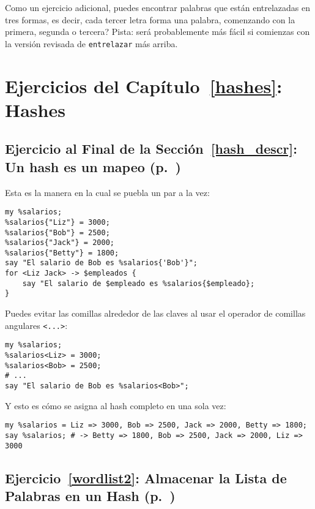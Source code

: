 Como un ejercicio adicional, puedes encontrar palabras
que están entrelazadas en tres formas, es decir, cada tercer letra forma
una palabra, comenzando con la primera, segunda o tercera?
Pista: será probablemente más fácil si comienzas con la
versión revisada de {\tt entrelazar}  más arriba.


\section{Ejercicios del Capítulo~\ref{hashes}: Hashes}

\subsection{Ejercicio al Final de la Sección~\ref{hash_descr}: Un hash es un mapeo (p.~\pageref{ex_employees})}
\label{sol_ex_employees}

Esta es la manera en la cual se puebla un par a la vez:

\begin{verbatim}
my %salarios;
%salarios{"Liz"} = 3000;
%salarios{"Bob"} = 2500;
%salarios{"Jack"} = 2000;
%salarios{"Betty"} = 1800;
say "El salario de Bob es %salarios{'Bob'}";
for <Liz Jack> -> $empleados {
    say "El salario de $empleado es %salarios{$empleado};
}
\end{verbatim}

Puedes evitar las comillas alrededor de las claves al 
usar el operador de comillas angulares \verb|<...>|:

\begin{verbatim}
my %salarios;
%salarios<Liz> = 3000;
%salarios<Bob> = 2500;
# ...
say "El salario de Bob es %salarios<Bob>";
\end{verbatim}

Y esto es cómo se asigna al hash completo en 
una sola vez:

\begin{verbatim}
my %salarios = Liz => 3000, Bob => 2500, Jack => 2000, Betty => 1800;
say %salarios; # -> Betty => 1800, Bob => 2500, Jack => 2000, Liz => 3000
\end{verbatim}

\subsection{Ejercicio~\ref{wordlist2}: Almacenar la Lista de Palabras en un Hash (p.~\pageref{wordlist2})}
\label{sol_wordlist2}

